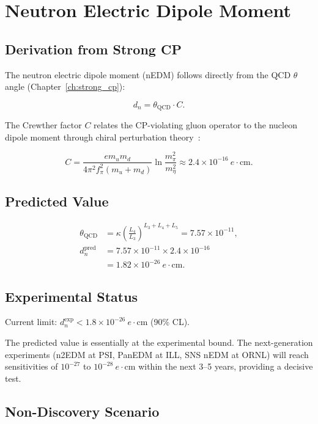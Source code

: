 \chapter{Neutron Electric Dipole Moment}
\label{ch:neutron_edm}

\section{Derivation from Strong CP}

The neutron electric dipole moment (nEDM) follows directly from the QCD
\(\theta\) angle (Chapter~\ref{ch:strong_cp}):

\[
d_n = \theta_{\text{QCD}} \cdot C.
\]

The Crewther factor \(C\) relates the CP-violating gluon operator to the
nucleon dipole moment through chiral perturbation theory~\cite{crewther1979}:

\[
C = \frac{e m_u m_d}{4\pi^2 f_\pi^2 (m_u + m_d)} \ln\frac{m_\pi^2}{m_\eta^2}
  \approx 2.4 \times 10^{-16}\ e\cdot\text{cm}.
\]

\section{Predicted Value}

\[
\begin{aligned}
\theta_{\text{QCD}} &= \kappa\left(\frac{L_4}{L_3}\right)^{L_3+L_4+L_5}
                    = 7.57 \times 10^{-11}, \\[4pt]
d_n^{\text{pred}} &= 7.57 \times 10^{-11} \times 2.4 \times 10^{-16} \\
                  &= 1.82 \times 10^{-26}\ e\cdot\text{cm}.
\end{aligned}
\]

\section{Experimental Status}

Current limit: \(d_n^{\text{exp}} < 1.8 \times 10^{-26}\ e\cdot\text{cm}\)
(90\% CL).

The predicted value is essentially at the experimental bound.  The
next-generation experiments (n2EDM at PSI, PanEDM at ILL, SNS nEDM at
ORNL) will reach sensitivities of \(10^{-27}\) to \(10^{-28}\
e\cdot\text{cm}\) within the next 3--5 years, providing a decisive test.

\section{Non-Discovery Scenario}

